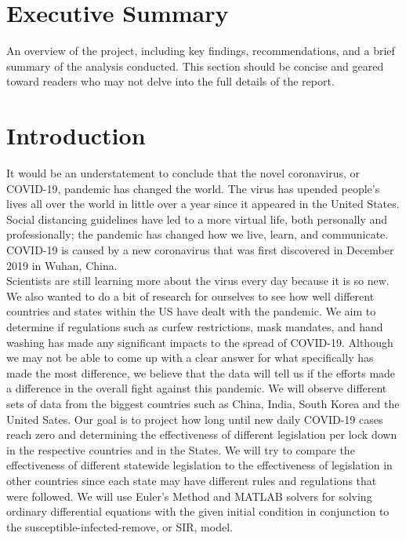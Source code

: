 \documentclass[a4paper,10pt]{article}
\begin{document}
\section{Executive Summary}

An overview of the project, including key findings, recommendations, and a brief summary of the analysis conducted. This section should be concise and geared toward readers who may not delve into the full details of the report. 

\section{Introduction}
It would be an understatement to conclude that the novel coronavirus, or COVID-19, pandemic has changed the world. The virus has upended people's lives all over the world in little over a year since it appeared in the United States. Social distancing guidelines have led to a more virtual life, both personally and professionally; the pandemic has changed how we live, learn, and communicate. COVID-19 is caused by a new coronavirus that was first discovered in December 2019 in Wuhan, China\textsuperscript{\cite{COV-19 1}}.\\
\indent Scientists are still learning more about the virus every day because it is so new. We also wanted to do a bit of research for ourselves to see how well different countries and states within the US have dealt with the pandemic. We aim to determine if regulations such as curfew restrictions, mask mandates, and hand washing has made any significant impacts to the spread of COVID-19. Although we may not be able to come up with a clear answer for what specifically has made the most difference, we believe that the data will tell us if the efforts made a difference in the overall fight against this pandemic. We will observe different sets of data from the biggest countries such as China, India, South Korea and the United Sates. Our goal is to project how long until new daily COVID-19 cases reach zero and determining the effectiveness of different legislation per lock down in the respective countries and in the States. We will try to compare the effectiveness of different statewide legislation to the effectiveness of legislation in other countries since each state may have different rules and regulations that were followed. We will use Euler's Method and MATLAB\textsuperscript{\textregistered} solvers for solving ordinary differential equations with the given initial condition in conjunction to the susceptible-infected-remove, or SIR, model. 
\end{document}
